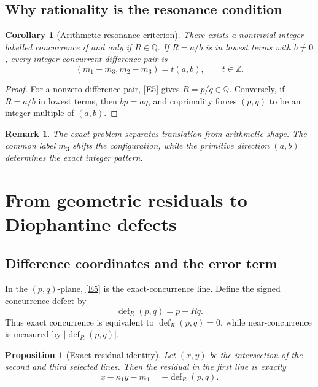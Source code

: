 \documentclass[12pt]{article}
\newtheorem{proposition}[theorem]{Proposition}
\newtheorem{corollary}[theorem]{Corollary}
\newtheorem{remark}[theorem]{Remark}
\newcommand{\Z}{\mathbb{Z}}
\newcommand{\Q}{\mathbb{Q}}
\newcommand{\defect}{\operatorname{def}}
\begin{document}
\subsection{Why rationality is the resonance condition}
\begin{corollary}[Arithmetic resonance criterion]
There exists a nontrivial integer-labelled concurrence if and only if $R\in\Q$. If $R=a/b$ is in lowest terms with $b\neq0$, every integer concurrent difference pair is
\[
(m_1-m_3,m_2-m_3)=t(a,b),\qquad t\in\Z.
\]
\end{corollary}

\begin{proof}
For a nonzero difference pair, \eqref{E5} gives $R=p/q\in\Q$. Conversely, if $R=a/b$ in lowest terms, then $bp=aq$, and coprimality forces $(p,q)$ to be an integer multiple of $(a,b)$.
\end{proof}

\begin{remark}
The exact problem separates translation from arithmetic shape. The common label $m_3$ shifts the configuration, while the primitive direction $(a,b)$ determines the exact integer pattern.
\end{remark}

\section{From geometric residuals to Diophantine defects}

\subsection{Difference coordinates and the error term}
In the $(p,q)$-plane, \eqref{E5} is the exact-concurrence line. Define the signed concurrence defect by
\begin{equation}\tag{E6}\label{E6}
\defect_R(p,q)=p-Rq.
\end{equation}
Thus exact concurrence is equivalent to $\defect_R(p,q)=0$, while near-concurrence is measured by $|\defect_R(p,q)|$.

\begin{proposition}[Exact residual identity]
Let $(x,y)$ be the intersection of the second and third selected lines. Then the residual in the first line is exactly
\begin{equation}\tag{E7}\label{E7}
x-\kappa_1y-m_1=-\defect_R(p,q).
\end{equation}
\end{proposition}
\end{document}
